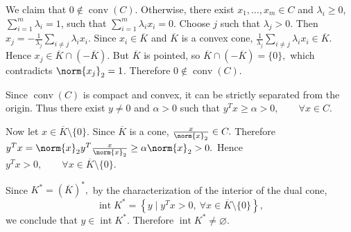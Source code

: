 \documentclass{ctexart}
\begin{document}
\begin{solution}
\begin{enumerate}
      We claim that
      \(
        0\notin \operatorname{conv}(C).
      \)
      Otherwise, there exist \(x_1,\ldots,x_m\in C\) and
      \(\lambda_i\geq 0\), \(\sum_{i=1}^m\lambda_i=1\), such that
      \(
        \sum_{i=1}^m \lambda_i x_i=0.
      \)
      Choose \(j\) such that \(\lambda_j>0\). Then
      \(
        x_j
        =
        -\frac{1}{\lambda_j}
        \sum_{i\neq j}\lambda_i x_i.
      \)
      Since \(x_i\in\overline{K}\) and \(\overline{K}\) is a convex cone,
      \(
        \frac{1}{\lambda_j}
        \sum_{i\neq j}\lambda_i x_i\in\overline{K}.
      \)
      Hence
      \(
        x_j\in \overline{K}\cap(-\overline{K}).
      \)
      But \(\overline{K}\) is pointed, so
      \(
        \overline{K}\cap(-\overline{K})=\{0\},
      \)
      which contradicts \(\norm{x_j}_2=1\). Therefore
      \(
        0\notin \operatorname{conv}(C).
      \)

      Since \(\operatorname{conv}(C)\) is compact and convex, it can be
      strictly separated from the origin. Thus there exist \(y\neq0\) and
      \(\alpha>0\) such that
      \(
        y^Tx\geq \alpha>0,
        \qquad
        \forall x\in C.
      \)

      Now let \(x\in\overline{K}\setminus\{0\}\). Since \(\overline{K}\) is
      a cone,
      \(
        \frac{x}{\norm{x}_2}\in C.
      \)
      Therefore
      \(
        y^Tx
        =
        \norm{x}_2
        y^T\frac{x}{\norm{x}_2}
        \geq
        \alpha\norm{x}_2
        >0.
      \)
      Hence
      \(
        y^Tx>0,
        \qquad
        \forall x\in\overline{K}\setminus\{0\}.
      \)

      Since
      \(
        K^*=(\overline{K})^*,
      \)
      by the characterization of the interior of the dual cone,
      \[
        \operatorname{int}K^*
        =
        \left\{
          y\mid y^Tx>0,\
          \forall x\in\overline{K}\setminus\{0\}
        \right\},
      \]
      we conclude that
      \(
        y\in\operatorname{int}K^*.
      \)
      Therefore
      \(
        \operatorname{int}K^*\neq\varnothing.
      \)
  \end{enumerate}

\end{solution}
\end{document}

